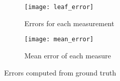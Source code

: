 \begin{figure}[ht] 
  \centering
  \begin{subfigure}{.5\textwidth}
    \centering
    \texttt{[image: leaf\_error]}
    \caption{Errors for each measurement}
  \end{subfigure}%
  \begin{subfigure}{.5\textwidth}
    \centering
    \texttt{[image: mean\_error]}
    \caption{Mean error of each measure}
  \end{subfigure}
  \caption{Errors computed from ground truth}
\end{figure}




